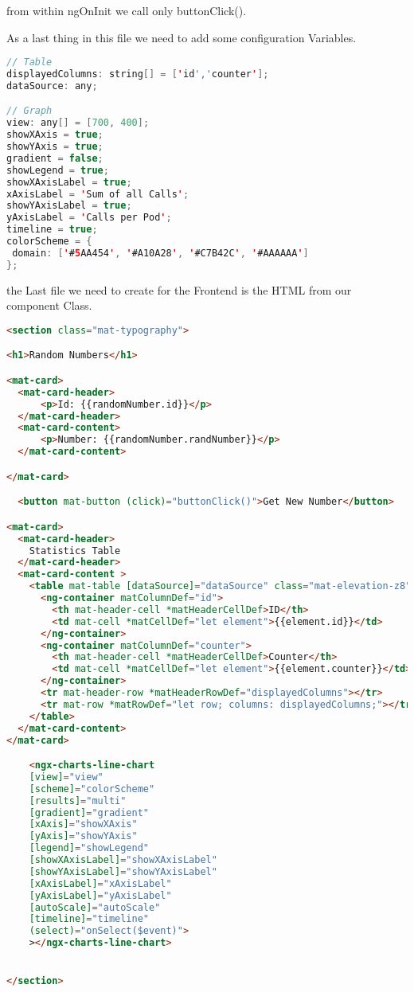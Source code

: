 from within ngOnInit we call only buttonClick().

As a last thing in this file we need to add some configuration Variables.
\begin{lstlisting}[language=Java]
// Table
displayedColumns: string[] = ['id','counter'];
dataSource: any;

// Graph
view: any[] = [700, 400];
showXAxis = true;
showYAxis = true;
gradient = false;
showLegend = true;
showXAxisLabel = true;
xAxisLabel = 'Sum of all Calls';
showYAxisLabel = true;
yAxisLabel = 'Calls per Pod';
timeline = true;
colorScheme = {
 domain: ['#5AA454', '#A10A28', '#C7B42C', '#AAAAAA']
};
\end{lstlisting}

the Last file we need to create for the Frontend is the HTML from our component Class.
\begin{lstlisting}[language=HTML]
<section class="mat-typography">

<h1>Random Numbers</h1>

<mat-card>
  <mat-card-header>
      <p>Id: {{randomNumber.id}}</p>
  </mat-card-header>
  <mat-card-content>
      <p>Number: {{randomNumber.randNumber}}</p>
  </mat-card-content>

</mat-card>

  <button mat-button (click)="buttonClick()">Get New Number</button>

<mat-card>
  <mat-card-header>
    Statistics Table
  </mat-card-header>
  <mat-card-content >
    <table mat-table [dataSource]="dataSource" class="mat-elevation-z8">
      <ng-container matColumnDef="id">
        <th mat-header-cell *matHeaderCellDef>ID</th>
        <td mat-cell *matCellDef="let element">{{element.id}}</td>
      </ng-container>
      <ng-container matColumnDef="counter">
        <th mat-header-cell *matHeaderCellDef>Counter</th>
        <td mat-cell *matCellDef="let element">{{element.counter}}</td>
      </ng-container>
      <tr mat-header-row *matHeaderRowDef="displayedColumns"></tr>
      <tr mat-row *matRowDef="let row; columns: displayedColumns;"></tr>
    </table>
  </mat-card-content>
</mat-card>

    <ngx-charts-line-chart 
    [view]="view"
    [scheme]="colorScheme"
    [results]="multi"
    [gradient]="gradient"
    [xAxis]="showXAxis"
    [yAxis]="showYAxis"
    [legend]="showLegend"
    [showXAxisLabel]="showXAxisLabel"
    [showYAxisLabel]="showYAxisLabel"
    [xAxisLabel]="xAxisLabel"
    [yAxisLabel]="yAxisLabel"
    [autoScale]="autoScale"
    [timeline]="timeline"
    (select)="onSelect($event)">
    ></ngx-charts-line-chart>


</section>
\end{lstlisting}


